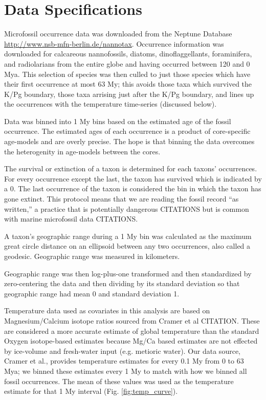 \documentclass[12pt,letterpaper]{article}
\begin{document}
\section{Data Specifications}

Microfossil occurrence data was downloaded from the Neptune Database \url{http://www.nsb-mfn-berlin.de/nannotax}. Occurrence information was downloaded for calcareous nannofossils, diatoms, dinoflaggellants, foraminifera, and radiolarians from the entire globe and having occurred between 120 and 0 Mya. This selection of species was then culled to just those species which have their first occurrence at most 63 My; this avoids those taxa which survived the K/Pg boundary, those taxa arrising just after the K/Pg boundary, and lines up the occurrences with the temperature time-series (discussed below).

Data was binned into 1 My bins based on the estimated age of the fossil occurrence. The estimated ages of each occurrence is a product of core-specific age-models and are overly precise. The hope is that binning the data overcomes the heterogenity in age-models between the cores. 

The survival or extinction of a taxon is determined for each taxons' occurrences. For every occurrence except the last, the taxon has survived which is indicated by a 0. The last occurrence of the taxon is considered the bin in which the taxon has gone extinct. This protocol means that we are reading the fossil record ``as written,'' a practice that is potentially dangerous CITATIONS but is common with marine microfossil data CITATIONS.

A taxon's geographic range during a 1 My bin was calculated as the maximum great circle distance on an ellipsoid between any two occurrences, also called a geodesic. Geographic range was measured in kilometers.

Geographic range was then log-plus-one transformed and then standardized by zero-centering the data and then dividing by its standard deviation so that geographic range had mean 0 and standard deviation 1.

Temperature data used as covariates in this analysis are based on Magnesium/Calcium isotope ratios sourced from Cramer et al CITATION. These are considered a more accurate estimate of global temperature than the standard Oxygen isotope-based estimates because Mg/Ca based estimates are not effected by ice-volume and fresh-water input (e.g. metioric water). Our data source, Cramer et al., provides temperature estimates for every 0.1 My from 0 to 63 Mya; we binned these estimates every 1 My to match with how we binned all fossil occurrences. The mean of these values was used as the temperature estimate for that 1 My interval (Fig. \ref{fig:temp_curve}).
\end{document}
